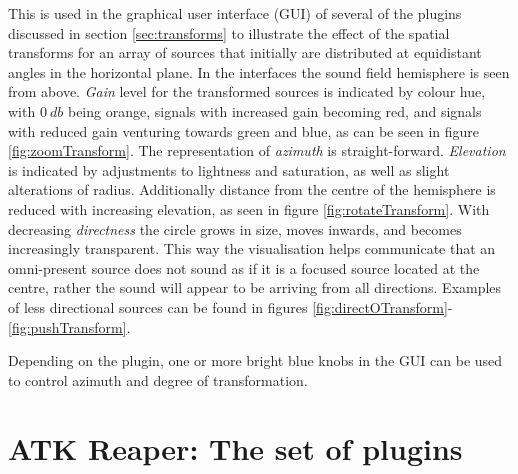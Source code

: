 \documentclass{article}
\begin{document}
This is used in the graphical user interface (GUI) of several of the plugins discussed in section \ref{sec:transforms} to illustrate the effect of the spatial transforms for an array of sources that initially are distributed at equidistant angles in the horizontal plane.
In the interfaces the sound field hemisphere is seen from above. 
\emph{Gain} level for the transformed sources is indicated by colour hue, with $0\: db$ being orange, signals with increased gain becoming red, and signals with reduced gain venturing towards green and blue, as can be seen in figure \ref{fig:zoomTransform}.
The representation of \emph{azimuth} is straight-forward.
\emph{Elevation} is indicated by adjustments to lightness and saturation, as well as slight alterations of radius.
Additionally distance from the centre of the hemisphere is reduced with increasing elevation, as seen in figure \ref{fig:rotateTransform}.
With decreasing \emph{directness} the circle grows in size, moves inwards, and becomes increasingly transparent.
This way the visualisation helps communicate that an omni-present source does not sound as if it is a focused source located at the centre, rather the sound will appear to be arriving from all directions.
Examples of less directional sources can be found in figures \ref{fig:directOTransform}-\ref{fig:pushTransform}.

Depending on the plugin, one or more bright blue knobs in the GUI can be used to control azimuth and degree of transformation.




\section{ATK Reaper: The set of plugins}\label{sec:implementation}
\end{document}
